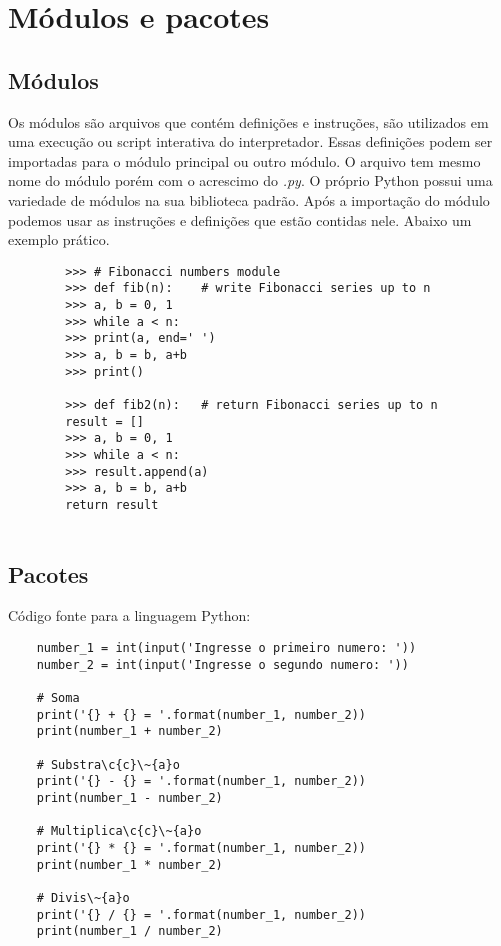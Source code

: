 	
    \section{Módulos e pacotes}



            \subsection{Módulos}
	Os módulos são arquivos que contém definições e instruções, são utilizados em uma execução ou script interativa do interpretador. Essas definições podem ser importadas para o módulo principal ou outro módulo. O arquivo tem mesmo nome do módulo porém com o acrescimo do \textit{.py}. O próprio Python possui uma variedade de módulos na sua biblioteca padrão. Após a importação do módulo podemos usar as instruções e definições que estão contidas nele. Abaixo um exemplo prático.
	\begin{lstlisting}
		>>> # Fibonacci numbers module
		>>> def fib(n):    # write Fibonacci series up to n
		>>> a, b = 0, 1
		>>> while a < n:
		>>> print(a, end=' ')
		>>> a, b = b, a+b
		>>> print()
		
		>>> def fib2(n):   # return Fibonacci series up to n
		result = []
		>>> a, b = 0, 1
		>>> while a < n:
		>>> result.append(a)
		>>> a, b = b, a+b
		return result
		
	\end{lstlisting}


            \subsection{Pacotes}






    Código fonte para a linguagem Python:
    \begin{lstlisting}
    number_1 = int(input('Ingresse o primeiro numero: '))
    number_2 = int(input('Ingresse o segundo numero: '))

    # Soma
    print('{} + {} = '.format(number_1, number_2))
    print(number_1 + number_2)

    # Substra\c{c}\~{a}o
    print('{} - {} = '.format(number_1, number_2))
    print(number_1 - number_2)

    # Multiplica\c{c}\~{a}o
    print('{} * {} = '.format(number_1, number_2))
    print(number_1 * number_2)

    # Divis\~{a}o
    print('{} / {} = '.format(number_1, number_2))
    print(number_1 / number_2)
    \end{lstlisting}





